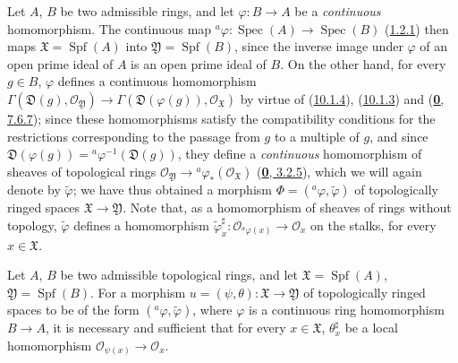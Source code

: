 \begin{env}[10.2.1]
\label{I.10.2.1}
Let $A$, $B$ be two admissible rings, and let
$\varphi:B\to A$ be a \emph{continuous} homomorphism. The continuous map
$ {}^a\varphi:\operatorname{Spec}(A)\to\operatorname{Spec}(B)$
(\hyperref[I.1.2.1]{1.2.1}) then maps
$\mathfrak{X}=\operatorname{Spf}(A)$ into
$\mathfrak{Y}=\operatorname{Spf}(B)$, since the inverse image under
$\varphi$ of an open prime ideal of $A$ is an open prime ideal of
$B$. On the other hand, for every $g\in B$, $\varphi$ defines a continuous
homomorphism $\Gamma(\mathfrak{D}(g),\mathscr{O}_{\mathfrak{Y}})\to
\Gamma(\mathfrak{D}(\varphi(g)),\mathscr{O}_{\mathfrak{X}})$
by virtue of (\hyperref[I.10.1.4]{10.1.4}),
(\hyperref[I.10.1.3]{10.1.3}) and
(\hyperref[0.7.6.7]{\textbf{0}, 7.6.7}); since these homomorphisms satisfy the
compatibility conditions for the restrictions corresponding to the
passage from $g$ to a multiple of $g$, and since
$\mathfrak{D}(\varphi(g))={}^a\varphi^{-1}(\mathfrak{D}(g))$, they
define a \emph{continuous} homomorphism of sheaves of topological
rings
$\mathscr{O}_{\mathfrak{Y}}\to
{}^a\varphi_*(\mathscr{O}_{\mathfrak{X}})$
(\hyperref[0.3.2.5]{\textbf{0}, 3.2.5}), which we will again denote by
$\widetilde{\varphi}$; we have thus obtained a morphism
$\Phi=({}^a\varphi,\widetilde{\varphi})$ of topologically ringed spaces
$\mathfrak{X}\to\mathfrak{Y}$. Note that, as a homomorphism of
sheaves of rings without topology, $\widetilde{\varphi}$ defines a
homomorphism
$\widetilde{\varphi}_x^\sharp:
\mathscr{O}_{{}^a\varphi(x)}\to\mathscr{O}_x$ on the stalks, for every
$x\in\mathfrak{X}$.
\end{env}

\begin{proposition}[10.2.2]
\label{I.10.2.2}
Let $A$, $B$ be two admissible topological rings, and let
$\mathfrak{X}=\operatorname{Spf}(A)$,
$\mathfrak{Y}=\operatorname{Spf}(B)$. For a morphism
$u=(\psi,\theta):\mathfrak{X}\to\mathfrak{Y}$ of topologically ringed
spaces to be of the form $({}^a\varphi,\widetilde{\varphi})$, where
$\varphi$ is a continuous ring homomorphism $B\to A$, it is necessary and
sufficient that for every $x\in\mathfrak{X}$,
$\theta_x^\sharp$ be a local homomorphism
$\mathscr{O}_{\psi(x)}\to\mathscr{O}_x$.
\end{proposition}

